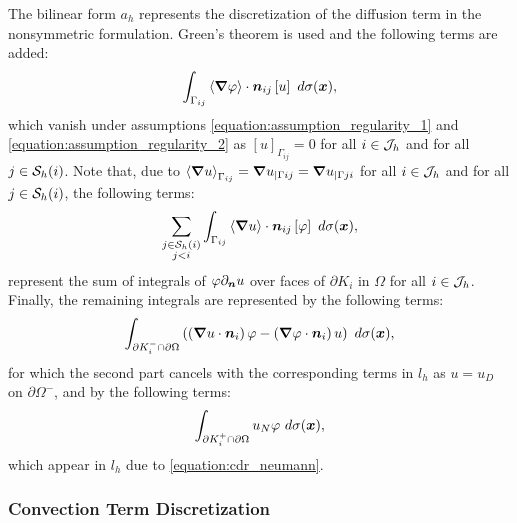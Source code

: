 The bilinear form $a_h$ represents the discretization of the diffusion term in the nonsymmetric formulation. Green's theorem is used and the following terms are added:
\begin{gather}
    \int_{\Gamma_{ij}} \left\langle \bm{\nabla} \varphi \right\rangle \cdot \bm{n}_{ij} \left[ u \right] ~ d \sigma(\bm{x}),
\end{gather}
which vanish under assumptions \cref{equation:assumption_regularity_1} and \cref{equation:assumption_regularity_2} as $\left[ u \right]_{\Gamma_{ij}} = 0$ for all $i \in \mathcal{J}_h$ and for all $j \in \mathcal{S}_h(i)$. Note that, due to $\left\langle \bm{\nabla} u \right\rangle_{\Gamma_{ij}} = \bm{\nabla} u_{\mid \Gamma{ij}} = \bm{\nabla} u_{\mid \Gamma{ji}}$ for all $i \in \mathcal{J}_h$ and for all $j \in \mathcal{S}_h(i)$, the following terms:
\begin{gather}
    \sum_{\substack{j \in \mathcal{S}_h(i) \\ j < i}} \int_{\Gamma_{ij}} \left\langle \bm{\nabla} u \right\rangle \cdot \bm{n}_{ij} \left[ \varphi \right] ~ d \sigma(\bm{x}),
\end{gather}
represent the sum of integrals of $\varphi \partial_{\bm{n}} u$ over faces of $\partial K_i$ in $\Omega$ for all $i \in \mathcal{J}_h$. Finally, the remaining integrals are represented by the following terms:
\begin{gather}
    \int_{\partial K_i^- \cap \partial \Omega} \left( \left( \bm{\nabla} u \cdot \bm{n}_i \right) \varphi - \left( \bm{\nabla} \varphi \cdot \bm{n}_i \right) u \right) ~ d \sigma(\bm{x}),
\end{gather}
for which the second part cancels with the corresponding terms in $l_h$ as $u = u_D$ on $\partial \Omega^-$, and by the following terms:
\begin{gather}
    \int_{\partial K_i^+ \cap \partial \Omega} u_N \varphi ~ d \sigma(\bm{x}),
\end{gather}
which appear in $l_h$ due to \cref{equation:cdr_neumann}.

\newpage
\subsubsection{Convection Term Discretization}

